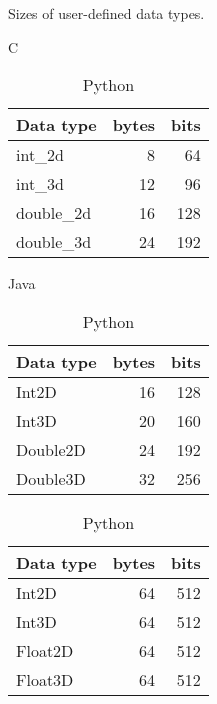 \documentclass[12pt,letterpaper]{article}
\begin{document}
			\begin{table}[H]
		    \caption{Sizes of user-defined data types.}
		    \label{table:usr}
		    \centering
		    \begin{subtable}{.33\linewidth}
		      \centering
		        \caption{C}
		        \label{table:usr-c}
					\begin{tabular}{l r r}
						\toprule
						Data type & bytes & bits\\
						\midrule
						int\_2d       & 8 &       64 \\
						int\_3d       & 12 &       96 \\
						double\_2d    & 16 &      128 \\
						double\_3d    & 24 &      192 \\
						\bottomrule
		        \end{tabular}
		    \end{subtable}%
		    \begin{subtable}{.33\linewidth}
		      \centering
		        \caption{Java}
		        \label{table:usr-java}
					\begin{tabular}{l r r}
						\toprule
						Data type & bytes & bits\\
						\midrule
					      Int2D        & 16 &      128 \\
					      Int3D        & 20 &      160 \\
					      Double2D     & 24 &      192 \\
					      Double3D     & 32 &      256 \\
					      \bottomrule
		        \end{tabular}%
		    \end{subtable} 
		    \begin{subtable}{.33\linewidth}
		      \centering
		        \caption{Python}
		        \label{table:usr-py}
					\begin{tabular}{l r r}
						\toprule
						Data type & bytes & bits\\
						\midrule
						Int2D             &64&     512 \\
						Int3D             &64 &    512 \\
						Float2D           &64 &    512 \\
						Float3D          & 64  &   512 \\
						\bottomrule
		        \end{tabular}
		    \end{subtable} 
		\end{table}
\end{document}
